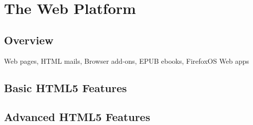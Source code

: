 \chapter{The Web Platform}

\section{Overview}

Web pages, HTML mails, Browser add-ons, EPUB ebooks, FirefoxOS Web apps

\section{Basic HTML5 Features}



\section{Advanced HTML5 Features}

